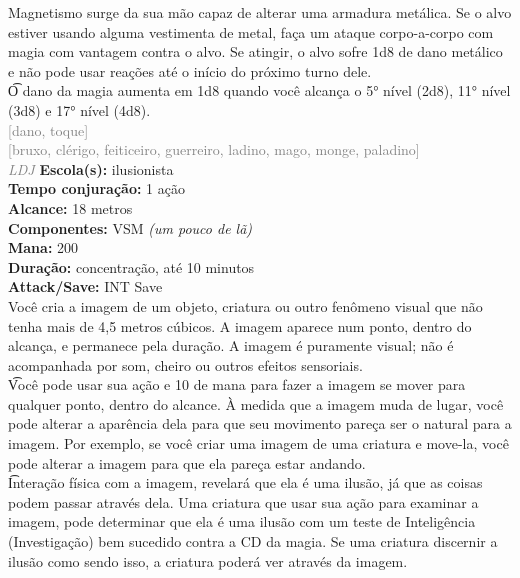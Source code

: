 \documentclass{RPG_Adventure}[2021/10/20]
\begin{document}
{\normalsize Magnetismo surge da sua mão capaz de alterar uma armadura metálica. Se o alvo estiver usando alguma vestimenta de metal, faça um ataque corpo-a-corpo com magia com vantagem contra o alvo. Se atingir, o alvo sofre 1d8 de dano metálico e não pode usar reações até o início do próximo turno dele.\\\t O dano da magia aumenta em 1d8 quando você alcança o 5° nível (2d8), 11° nível (3d8) e 17° nível (4d8).\\}
{\scriptsize \textcolor{gray}{[dano, toque]\\}}
{\scriptsize \textcolor{gray}{[bruxo, clérigo, feiticeiro, guerreiro, ladino, mago, monge, paladino]\\}}
{\tiny \textcolor{gray}{\textit{LDJ}}}
{\small \t \textbf{Escola(s):} ilusionista\\\t \textbf{Tempo conjuração:} 1 ação\\\t \textbf{Alcance:} 18 metros\\\t \textbf{Componentes:} VSM \textit{(um pouco de lã)}\\\t \textbf{Mana:} 200\\\t \textbf{Duração:} concentração, até 10 minutos\\\t \textbf{Attack/Save:} INT Save\\}
{\normalsize Você cria a imagem de um objeto, criatura ou outro fenômeno visual que não tenha mais de 4,5 metros cúbicos. A imagem aparece num ponto, dentro do alcança, e permanece pela duração. A imagem é puramente visual; não é acompanhada por som, cheiro ou outros efeitos sensoriais.\\\t Você pode usar sua ação e 10 de mana para fazer a imagem se mover para qualquer ponto, dentro do alcance. À medida que a imagem muda de lugar, você pode alterar a aparência dela para que seu movimento pareça ser o natural para a imagem. Por exemplo, se você criar uma imagem de uma criatura e move-la, você pode alterar a imagem para que ela pareça estar andando.\\\t Interação física com a imagem, revelará que ela é uma ilusão, já que as coisas podem passar através dela. Uma criatura que usar sua ação para examinar a imagem, pode determinar que ela é uma ilusão com um teste de Inteligência (Investigação) bem sucedido contra a CD da magia. Se uma criatura discernir a ilusão como sendo isso, a criatura poderá ver através da imagem.\\}
\end{document}
